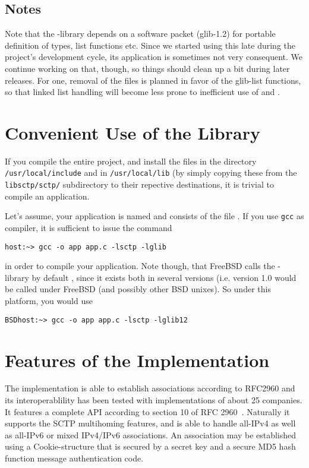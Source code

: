 \documentclass[10pt]{article}
\newcommand{\lib}{ \libname{libsctp}-library }
\begin{document}
\subsection{Notes}
Note that the \lib depends on a software packet (glib-1.2) for portable definition of
types, list functions etc.
Since we started using this late during the
project's development cycle, its application is sometimes not very 
consequent. We continue working on that, though, so things should clean
up a bit during later releases. For one, removal of the 
files is planned in favor of the glib-list functions,
so that linked list handling will become less prone
to inefficient use of  and .

\section{Convenient Use of the Library}
If you compile the entire project, and install the files
 in the directory \texttt{/usr/local/include}
and  in \texttt{/usr/local/lib} (by simply
copying these from the \texttt{libsctp/sctp/} subdirectory
to their repective destinations, it is trivial to compile
an application.

Let's assume, your application is named 
and consists of the file . If you use \texttt{gcc} as
compiler, it is sufficient to issue the command
\begin{verbatim}
host:~> gcc -o app app.c -lsctp -lglib
\end{verbatim}
in order to compile your application. Note though, that FreeBSD calls
the -library by default , since it
exists both in several versions (i.e.   version 1.0 would
be called  under FreeBSD (and possibly other
BSD unixes). So under this platform, you would use
\begin{verbatim}
BSDhost:~> gcc -o app app.c -lsctp -lglib12
\end{verbatim}


\section{Features of the Implementation}
The implementation is able to establish associations according to RFC2960 and
its interoperablility has been tested with implementations of about 25 companies.
It features a complete API according to section 10 of RFC 2960~\cite{RFC2960}.
Naturally it supports the SCTP multihoming features, and is able to handle
all-IPv4  as well as all-IPv6 or mixed IPv4/IPv6 associations.
An association may be established using a Cookie-structure that is secured
by a secret key and a secure MD5 hash function message authentication
code.
\end{document}
